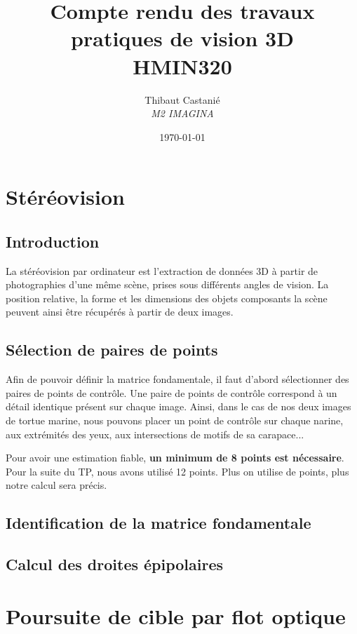 \documentclass[a4paper]{article}
\title{\textbf{Compte rendu des travaux \\pratiques de vision 3D}\\HMIN320}
\author{Thibaut Castanié\\\textit{M2 IMAGINA}}
\date{\today}
\begin{document}
\maketitle
\renewcommand{\cftsecleader}{\cftdotfill{\cftdotsep}}
\vspace{2cm}


\section{Stéréovision}
\subsection{Introduction}
La stéréovision par ordinateur est l'extraction de données 3D à partir de photographies d'une même scène, prises sous différents angles de vision. La position relative, la forme et les dimensions des objets composants la scène peuvent ainsi être récupérés à partir de deux images.
\subsection{Sélection de paires de points}
Afin de pouvoir définir la matrice fondamentale, il faut d'abord sélectionner des paires de points de contrôle. Une paire de points de contrôle correspond à un détail identique présent sur chaque image. Ainsi, dans le cas de nos deux images de tortue marine, nous pouvons placer un point de contrôle sur chaque narine, aux extrémités des yeux, aux intersections de motifs de sa carapace... 


Pour avoir une estimation fiable, \textbf{un minimum de 8 points est nécessaire}. Pour la suite du TP, nous avons utilisé 12 points. Plus on utilise de points, plus notre calcul sera précis.



\subsection{Identification de la matrice fondamentale}
\subsection{Calcul des droites épipolaires}


\section{Poursuite de cible par flot optique}
\end{document}
